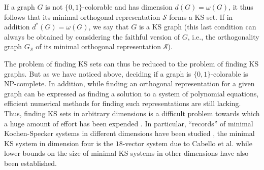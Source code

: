 \documentclass[twocolumn, a4paper, superscriptaddress,nofootinbib, accepted=2020-08-07, hyperref]{quantumarticle}
\begin{document}
If a graph $G$ is not $\{0,1\}$-colorable and has dimension $d(G)=\omega(G)$, it thus follows that its minimal orthogonal representation $\mathcal{S}$ forms a KS set. If in addition $d^*(G)=\omega(G)$, we say that $G$ is a KS graph (this last condition can always be obtained by considering the faithful version of $G$, i.e., the orthogonality graph $G_\mathcal{S}$ of its minimal orthogonal representation $\mathcal{S}$).



The problem of finding KS sets can thus be reduced to the problem of finding KS graphs. But as we have noticed above, deciding if a graph is $\{0,1\}$-colorable is NP-complete. In addition, while finding an orthogonal representation for a given graph can be expressed as finding a solution to a system of polynomial equations, efficient numerical methods for finding such representations are still lacking. Thus, finding KS sets in arbitrary dimensions is a difficult problem towards which a huge amount of effort has been expended \cite{CA96}. In particular, ``records'' of minimal Kochen-Specker systems in different dimensions have been studied \cite{CEG96}, the minimal KS system in dimension four is the $18$-vector system due to Cabello et al. \cite{CEG96, Cab08} while lower bounds on the size of minimal KS systems in other dimensions have also been established.
\end{document}
